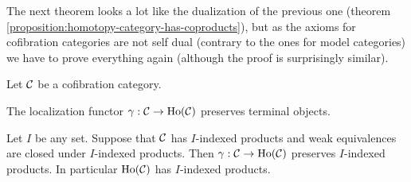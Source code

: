 

\noindent
The next theorem looks a lot like the dualization of the previous one (theorem \ref{proposition:homotopy-category-has-coproducts}), but as the axioms for cofibration categories are not self dual (contrary to the ones for model categories) we have to prove everything again (although the proof is surprisingly similar).

\begin{theorem}
Let $\mathcal{C}$ be a cofibration category.
\begin{rmnumerate}
    \item The localization functor $\gamma:\mathcal{C}\to\operatorname{Ho}(\mathcal{C})$ preserves terminal objects.
    \item Let $I$ be any set. Suppose that $\mathcal{C}$ has $I$-indexed products and weak equivalences are closed under $I$-indexed products. Then $\gamma:\mathcal{C}\to\operatorname{Ho}(\mathcal{C})$ preserves $I$-indexed products. In particular $\operatorname{Ho}(\mathcal{C})$ has $I$-indexed products.
\end{rmnumerate}
\end{theorem}

